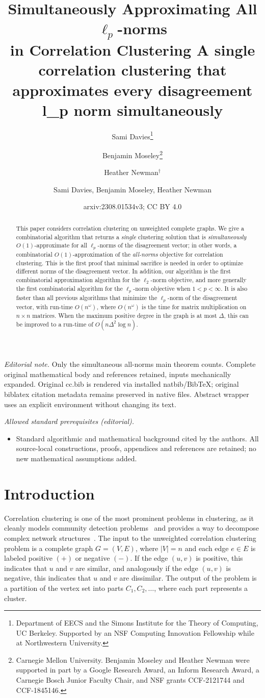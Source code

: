 \documentclass[11pt]{article}
\title{Simultaneously Approximating All $\ell_p$-norms\\ in Correlation Clustering }
\date{}
\author{Sami Davies\thanks{Department of EECS and the Simons Institute for the Theory of Computing, UC Berkeley. Supported by an NSF Computing Innovation Fellowship while at Northwestern University.} \and Benjamin Moseley\thanks{Carnegie Mellon University. Benjamin Moseley and Heather Newman were supported in part by  a Google Research Award, an Inform Research Award, a Carnegie Bosch Junior Faculty Chair, and NSF grants CCF-2121744  and  CCF-1845146.} \and Heather Newman$^\dagger$}
\title{A single correlation clustering that approximates every disagreement l\_p norm simultaneously}
\author{Sami Davies, Benjamin Moseley, Heather Newman}
\date{arxiv:2308.01534v3; CC BY 4.0}
\begin{document}
\maketitle
\noindent\textit{Editorial note.} Only the simultaneous all-norms main theorem counts. Complete original mathematical body and references retained, inputs mechanically expanded. Original cc.bib is rendered via installed natbib/BibTeX; original biblatex citation metadata remains preserved in native files. Abstract wrapper uses an explicit environment without changing its text.\par\medskip
\noindent\textit{Allowed standard prerequisites (editorial).}\begin{itemize}
\item Standard algorithmic and mathematical background cited by the authors. All source-local constructions, proofs, appendices and references are retained; no new mathematical assumptions added.
\end{itemize}\medskip



\begin{abstract}This paper considers correlation clustering on unweighted complete graphs. We give a combinatorial algorithm that returns a \emph{single} clustering solution that is \emph{simultaneously} $O(1)$-approximate for all $\ell_p$-norms of the disagreement vector;
in other words, a combinatorial $O(1)$-approximation of the \emph{all-norms} objective for correlation clustering.
This is the first proof that minimal sacrifice is needed in order to optimize different norms of the disagreement vector. In addition, our algorithm is the first combinatorial approximation algorithm for the $\ell_2$-norm objective, and more generally the first combinatorial algorithm for the $\ell_p$-norm objective when $1 < p < \infty$. 
It is also faster than all previous algorithms that minimize the $\ell_p$-norm of the disagreement vector, with run-time $O(n^\omega)$, where $O(n^\omega)$ is the time for matrix multiplication on $n \times n$ matrices. 
When the maximum positive degree in the graph is at most $\Delta$, this can be improved to a run-time of $O(n\Delta^2 \log n)$. 
\end{abstract}



\section{Introduction}
Correlation clustering is one of the most prominent problems in clustering, 
as it cleanly models community detection problems~\cite{veldt2018, SDELM21} and provides a way to decompose complex network structures~\cite{Wirth17, mccallum2004conditional}. 
The input to the unweighted correlation clustering problem is a complete graph $G=(V,E)$, where $|V|=n$ and each edge $e \in E$ is labeled positive $(+)$ or negative $(-)$.  
If the edge $(u,v)$ is positive, this indicates that $u$ and $v$ are similar, 
and analogously if the edge $(u,v)$ is negative, this indicates that $u$ and $v$ are dissimilar. 
The output of the problem is a partition of the vertex set into parts $C_1, C_2, \ldots$, where each part represents a cluster.   
\end{document}
